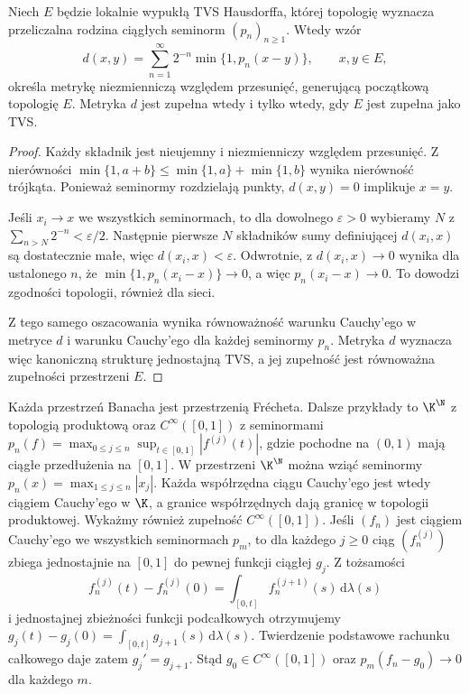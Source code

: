 \begin{stwierdzenie}\label{prop:frechet-metric11}
Niech $E$ będzie lokalnie wypukłą TVS Hausdorffa, której topologię
wyznacza przeliczalna rodzina ciągłych seminorm $(p_n)_{n\ge1}$.
Wtedy wzór
\[
 d(x,y)=\sum_{n=1}^{\infty}2^{-n}\min\{1,p_n(x-y)\},\qquad x,y\in E,
\]
określa metrykę niezmienniczą względem przesunięć, generującą
początkową topologię $E$. Metryka $d$ jest zupełna wtedy i tylko
wtedy, gdy $E$ jest zupełna jako TVS.
\end{stwierdzenie}
\begin{proof}
Każdy składnik jest nieujemny i niezmienniczy względem przesunięć.
Z nierówności $\min\{1,a+b\}\le \min\{1,a\}+\min\{1,b\}$
wynika nierówność trójkąta. Ponieważ seminormy rozdzielają punkty,
$d(x,y)=0$ implikuje $x=y$.

Jeśli $x_i\to x$ we wszystkich seminormach, to dla dowolnego
$\varepsilon>0$ wybieramy $N$ z $\sum_{n>N}2^{-n}<\varepsilon/2$.
Następnie pierwsze $N$ składników sumy definiującej $d(x_i,x)$
są dostatecznie małe, więc $d(x_i,x)<\varepsilon$.
Odwrotnie, z $d(x_i,x)\to0$ wynika dla ustalonego $n$,
że $\min\{1,p_n(x_i-x)\}\to0$, a więc $p_n(x_i-x)\to0$.
To dowodzi zgodności topologii, również dla sieci.

Z tego samego oszacowania wynika równoważność warunku Cauchy'ego
w metryce $d$ i warunku Cauchy'ego dla każdej seminormy $p_n$.
Metryka $d$ wyznacza więc kanoniczną strukturę jednostajną TVS,
a jej zupełność jest równoważna zupełności przestrzeni $E$.
\end{proof}

\begin{przyklad}\label{ex:frechet-list11}
Każda przestrzeń Banacha jest przestrzenią Frécheta. Dalsze
przykłady to $\K^{\N}$ z topologią produktową oraz
$C^\infty([0,1])$ z seminormami
$p_n(f)=\max_{0\le j\le n}\sup_{t\in[0,1]}|f^{(j)}(t)|$,
gdzie pochodne na $(0,1)$ mają ciągłe przedłużenia na $[0,1]$.
W przestrzeni $\K^{\N}$ można wziąć seminormy
$p_n(x)=\max_{1\le j\le n}|x_j|$. Każda współrzędna ciągu
Cauchy'ego jest wtedy ciągiem Cauchy'ego w $\K$, a granice
współrzędnych dają granicę w topologii produktowej.
Wykażmy również zupełność $C^\infty([0,1])$. Jeśli $(f_n)$ jest ciągiem
Cauchy'ego we wszystkich seminormach $p_m$, to dla każdego $j\ge0$
ciąg $(f_n^{(j)})$ zbiega jednostajnie na $[0,1]$ do pewnej funkcji
ciągłej $g_j$. Z tożsamości
\[
 f_n^{(j)}(t)-f_n^{(j)}(0)
 =\int_{[0,t]}f_n^{(j+1)}(s)\,\mathrm d\lambda(s)
\]
i jednostajnej zbieżności funkcji podcałkowych otrzymujemy
$g_j(t)-g_j(0)=\int_{[0,t]}g_{j+1}(s)\,\mathrm d\lambda(s)$.
Twierdzenie podstawowe rachunku całkowego daje zatem
$g_j'=g_{j+1}$. Stąd $g_0\in C^\infty([0,1])$ oraz
$p_m(f_n-g_0)\to0$ dla każdego $m$.
\end{przyklad}

